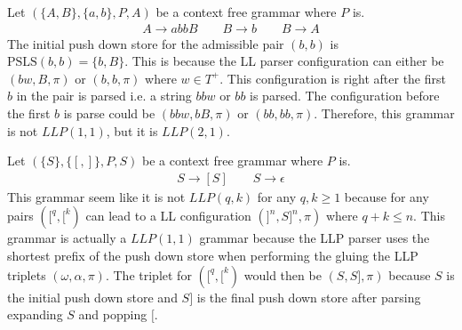 \begin{example}
    Let $(\{A, B\}, \{a, b\}, P, A)$ be a context free grammar where $P$ is.
    \begin{gather*}
        A \to a b b B \qquad B \to b \qquad B \to A
    \end{gather*}
    The initial push down store for the admissible pair $(b, b)$ is $\text{PSLS}(b, b) = \{b, B\}$. This is because the LL parser configuration can either be $(bw, B, \pi)$ or $(b, b, \pi)$ where $w \in T^+$. This configuration is right after the first $b$ in the pair is parsed i.e. a string $bbw$ or $bb$ is parsed. The configuration before the first $b$ is parse could be $(bbw, bB, \pi)$ or $(bb, bb, \pi)$. Therefore, this grammar is not $LLP(1, 1)$, but it is $LLP(2, 1)$.
\end{example}

\begin{example}
    Let $(\{S\}, \{[, ]\}, P, S)$ be a context free grammar where $P$ is.
    \begin{gather*}
        S \to [S] \qquad S \to \epsilon
    \end{gather*}
    This grammar seem like it is not $LLP(q, k)$ for any $q, k \geq 1$ because for any pairs $([^q, [^k)$ can lead to a LL configuration $(]^n, S]^n, \pi)$ where $q + k \leq n$. This grammar is actually a $LLP(1,1)$ grammar because the LLP parser uses the shortest prefix of the push down store when performing the gluing the LLP triplets $(\omega, \alpha, \pi)$. The triplet for $([^q, [^k)$ would then be $(S, S], \pi)$ because $S$ is the initial push down store and $S]$ is the final push down store after parsing expanding $S$ and popping $[$.
\end{example}
